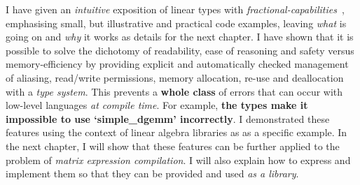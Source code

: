 I have given an \emph{intuitive} exposition of linear types with
\emph{fractional-capabilities}~\cite{boyland}, emphasising small, but
illustrative and practical code examples, leaving \emph{what} is going on and
\emph{why} it works as details for the next chapter. I have shown that it is
possible to solve the dichotomy of readability, ease of reasoning and safety
versus memory-efficiency by providing explicit and automatically checked
management of aliasing, read/write permissions, memory allocation, re-use and
deallocation with a \emph{type system}. This prevents a \textbf{whole class} of
errors that can occur with low-level languages \emph{at compile time}. For
example, \textbf{the types make it impossible to use `simple\_dgemm'
incorrectly}. I demonstrated these features using the context of linear algebra
libraries as as a specific example. In the next chapter, I will show that these
features can be further applied to the problem of \emph{matrix expression
compilation}. I will also explain how to express and implement them so that
they can be provided and used \emph{as a library}.
